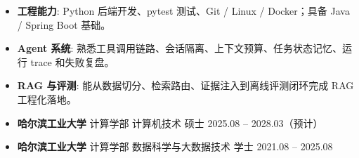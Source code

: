 \documentclass[zh]{resume}
\begin{document}
\makeheader

\begin{abstract}
求职方向：AI Agent / 大模型应用开发 / RAG 工程化实习；一周内到岗，每周 5 天，至少 3 个月。哈尔滨工业大学计算机技术硕士在读，预计 2028 年 3 月毕业。长期独立开发 TaleClaw Agent Runtime，重点解决真实任务中的上下文压缩、工具调用链路、任务状态续做、检索证据注入和执行复盘问题；已在其上构建 Coding Agent、代码安全 RAG、Web 实时活动流和评测矩阵。
\end{abstract}

\begin{itemize}
\item \textbf{工程能力}: Python 后端开发、pytest 测试、Git / Linux / Docker；具备 Java / Spring Boot 基础。
\item \textbf{Agent 系统}: 熟悉工具调用链路、会话隔离、上下文预算、任务状态记忆、运行 trace 和失败复盘。
\item \textbf{RAG 与评测}: 能从数据切分、检索路由、证据注入到离线评测闭环完成 RAG 工程化落地。
\end{itemize}


\begin{itemize}

  \item \textbf{哈尔滨工业大学}
        \quad 计算学部
        \quad 计算机技术
        \quad 硕士
        \hfill 2025.08 -- 2028.03（预计）

  \item \textbf{哈尔滨工业大学}
        \quad 计算学部
        \quad 数据科学与大数据技术
        \quad 学士
        \hfill 2021.08 -- 2025.08


\end{itemize}
\end{document}
